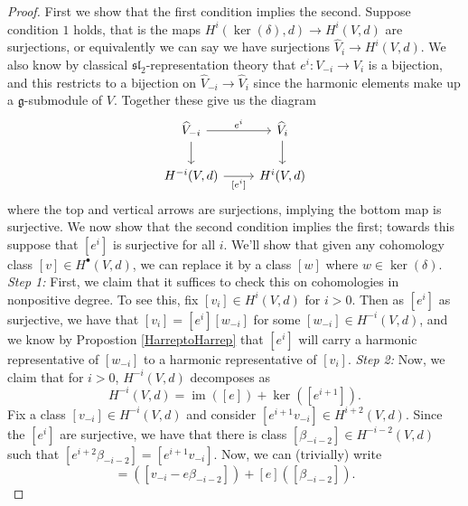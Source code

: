 \documentclass{amsart}
\newcommand{\ra}{\rightarrow}
\theoremstyle{definition}
\DeclareMathOperator{\im}{im}
\begin{document}
\begin{proof} First we show that the first condition implies the second. Suppose condition $1$ holds, that is the maps $H^i(\ker(\delta),d) \ra H^i(V,d)$ are surjections, or equivalently we can say we have surjections $\widehat{V}_i \ra H^i(V,d)$. We also know by classical $\mathfrak{sl}_2$-representation theory that $e^i:V_{-i}\ra V_{i}$ is a bijection, and this restricts to a bijection on $\widehat{V}_{-i} \ra \widehat{V}_{i}$ since the harmonic elements make up a $\mathfrak{g}$-submodule of $V$. Together these give us the diagram
\[\begin{tikzcd}[ampersand replacement=\&]
	{ \widehat{V}_{-i}} \& {\widehat{V}_i} \\
	{H^{-i}(V,d)} \& {H^i(V,d)}
	\arrow["{e^i}", from=1-1, to=1-2]
	\arrow[from=1-1, to=2-1]
	\arrow[from=1-2, to=2-2]
	\arrow["{[e^i]}"', from=2-1, to=2-2]
\end{tikzcd}\]
where the top and vertical arrows are surjections, implying the bottom map is surjective. We now show that the second condition implies the first; towards this suppose that $[e^i]$ is surjective for all $i$. We'll show that given any cohomology class $[v] \in H^\bullet(V,d)$, we can replace it by a class $[w]$ where $w \in \ker(\delta)$. \newline
\textit{Step 1:}
First, we claim that it suffices to check this on cohomologies in nonpositive degree. To see this, fix $[v_i] \in H^i(V,d)$ for $i>0$. Then as $[e^i]$ as surjective, we have that $[v_i]=[e^i][w_{-i}]$ for some $[w_{-i}] \in H^{-i}(V,d)$, and we know by Propostion \ref{HarreptoHarrep} that $[e^i]$ will carry a harmonic representative of $[w_{-i}]$ to a harmonic representative of $[v_{i}]$. \newline
\textit{Step 2:}
Now, we claim that for $i>0$, $H^{-i}(V,d)$ decomposes as
\begin{equation*}
    H^{-i}(V,d) = \im([e]) + \ker([e^{i+1}]).
\end{equation*}
Fix a class $[v_{-i}] \in H^{-i}(V,d)$ and consider $[e^{i+1}v_{-i}] \in H^{i+2}(V,d)$. Since the $[e^i]$ are surjective, we have that there is class $[\beta_{-i-2}] \in H^{-i-2}(V,d)$ such that $[e^{i+2}\beta_{-i-2}]=[e^{i+1}v_{-i}]$. Now, we can (trivially) write
\begin{equation*}
    [v_{-i}] = ([v_{-i}-e\beta_{-i-2}])+[e]([\beta_{-i-2}]).

\end{equation*}
\end{proof}
\end{document}
